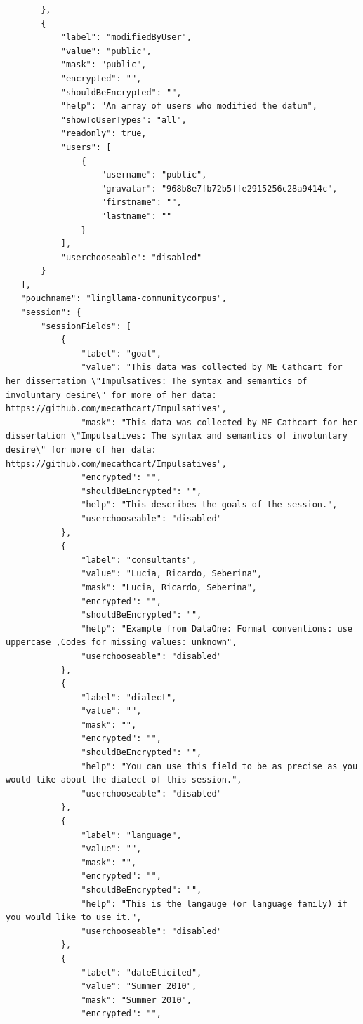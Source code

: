 \documentclass[12pt]{article}
\begin{document}
\begin{verbatim}
       },
       {
           "label": "modifiedByUser",
           "value": "public",
           "mask": "public",
           "encrypted": "",
           "shouldBeEncrypted": "",
           "help": "An array of users who modified the datum",
           "showToUserTypes": "all",
           "readonly": true,
           "users": [
               {
                   "username": "public",
                   "gravatar": "968b8e7fb72b5ffe2915256c28a9414c",
                   "firstname": "",
                   "lastname": ""
               }
           ],
           "userchooseable": "disabled"
       }
   ],
   "pouchname": "lingllama-communitycorpus",
   "session": {
       "sessionFields": [
           {
               "label": "goal",
               "value": "This data was collected by ME Cathcart for her dissertation \"Impulsatives: The syntax and semantics of involuntary desire\" for more of her data: https://github.com/mecathcart/Impulsatives",
               "mask": "This data was collected by ME Cathcart for her dissertation \"Impulsatives: The syntax and semantics of involuntary desire\" for more of her data: https://github.com/mecathcart/Impulsatives",
               "encrypted": "",
               "shouldBeEncrypted": "",
               "help": "This describes the goals of the session.",
               "userchooseable": "disabled"
           },
           {
               "label": "consultants",
               "value": "Lucia, Ricardo, Seberina",
               "mask": "Lucia, Ricardo, Seberina",
               "encrypted": "",
               "shouldBeEncrypted": "",
               "help": "Example from DataOne: Format conventions: use uppercase ,Codes for missing values: unknown",
               "userchooseable": "disabled"
           },
           {
               "label": "dialect",
               "value": "",
               "mask": "",
               "encrypted": "",
               "shouldBeEncrypted": "",
               "help": "You can use this field to be as precise as you would like about the dialect of this session.",
               "userchooseable": "disabled"
           },
           {
               "label": "language",
               "value": "",
               "mask": "",
               "encrypted": "",
               "shouldBeEncrypted": "",
               "help": "This is the langauge (or language family) if you would like to use it.",
               "userchooseable": "disabled"
           },
           {
               "label": "dateElicited",
               "value": "Summer 2010",
               "mask": "Summer 2010",
               "encrypted": "",

\end{verbatim}
\end{document}
